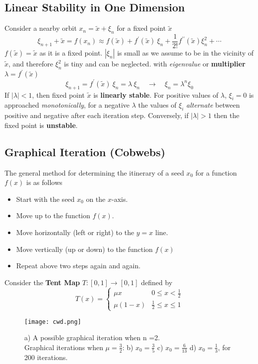 \subsection{Linear Stability in One Dimension}
Consider a nearby orbit $x_n=\tilde{x}+\xi_n$ for a fixed point $\tilde{x}$
\begin{equation}
	\xi_{n+1}+\tilde{x}=f(x_n)\approx f(\tilde{x})+f^\prime(\tilde{x})\ \xi_n+\frac{1}{2!}f^{\prime\prime}(\tilde{x})\xi_n^2+\cdots
\end{equation}
$f(\tilde{x})=\tilde{x}$ as it is a fixed point.
$|\xi_n|$ is small as we assume to be in the vicinity of $\tilde{x}$, and therefore $\xi_n^2$ is tiny and can be neglected.
with \emph{eigenvalue} or {\textbf{multiplier}} $\lambda=f^\prime(\tilde{x})$
\begin{equation}
	\xi_{n+1}=f^\prime(\tilde{x})\ \xi_n=\lambda\ \xi_n\quad\rightarrow\quad\xi_n=\lambda^n\xi_0
\end{equation}
If $|\lambda|<1$, then fixed point $\tilde{x}$ is \textbf{linearly stable}.
For positive values of $\lambda$, $\xi_i=0$ is approached \emph{monotonically}, for a negative $\lambda$ the values of $\xi_i$ \emph{alternate} between positive and negative after each iteration step.
Conversely, if $|\lambda|>1$ then the fixed point is {\textbf{unstable}}.
\subsection{Graphical Iteration (Cobwebs)}
The general method for determining the itinerary of a seed $x_0$ for a function $f(x)$ is as follows
\begin{itemize}
	\item Start with the seed $x_0$ on the $x$-axis.
	\item Move up to the function $f(x)$.
	\item Move horizontally (left or right) to the $y=x$ line.
	\item Move vertically (up or down) to the function $f(x)$
	\item Repeat above two steps again and again.
\end{itemize}
Consider the \textbf{Tent Map} $T:[0,1]\rightarrow[0,1]$ defined by
\begin{equation}
	T(x)=
	\begin{cases}
		\mu x&0\leq x<\frac{1}{2}\\
		\mu(1-x)&\frac{1}{2}\leq x\leq1
	\end{cases}
\end{equation}
\begin{figure}[h!]
	\centering
	\texttt{[image: cwd.png]}
	\caption{a) A possible graphical iteration when n =2.\\Graphical iterations when $\mu=\frac{3}{2}$: b) $x_0=\frac{3}{5}$ c) $x_0=\frac{6}{13}$ d) $x_0=\frac{1}{3}$, for 200 iterations.}
	\label{fig:cwd}
\end{figure}